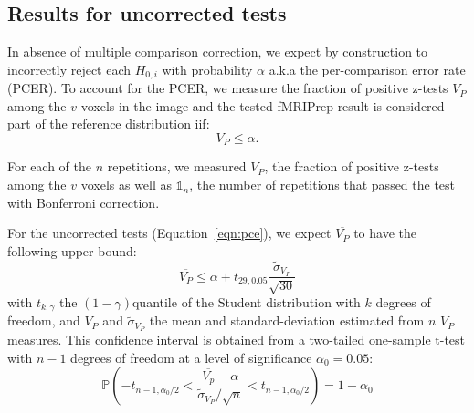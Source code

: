 \documentclass{article}
\newcommand{\fmriprep}{fMRIPrep\xspace}
\begin{document}
\begin{appendices}
    \section{Results for uncorrected tests}
    \label{appendix:multiple-comparison-tests}

    In absence of multiple comparison correction, we expect
    by construction to incorrectly reject each $H_{0,i}$ with probability $\alpha$ a.k.a
    the per-comparison error rate (PCER). To account for the PCER, we measure the
    fraction of positive z-tests $V_P$ among the $v$ voxels in the image and the
    tested \fmriprep result is considered part of the reference distribution iif:
    \begin{equation}
        V_{P} \leq \alpha.
        \label{eqn:pce}
    \end{equation}

    For each of the $n$ repetitions,
    we measured $V_P$, the fraction of
    positive z-tests among the $v$ voxels as well as $\mathds{1}_n$, the number of repetitions
    that passed the test with Bonferroni correction.

    For the uncorrected tests (Equation~\ref{eqn:pce}), we expect $\overline{V_P}$ to have
    the following upper bound:
    \[
        \overline{V_P} \leq
        \alpha  + t_{29,0.05} \frac{\tilde{\sigma}_{V_P}}{\sqrt{30}}
    \]
    with
    $t_{k,\gamma}$ the $(1-\gamma)$quantile of the Student distribution with $k$ degrees of freedom,
    and $\overline{V_P}$ and $\tilde{\sigma}_{V_P}$ the mean and standard-deviation estimated from
    $n$ $V_P$ measures.
    This confidence interval is obtained from a two-tailed one-sample
    t-test with $n-1$ degrees of freedom at a level of significance $\alpha_0=0.05$:
    \[
        \mathbb{P}
        \left(
        -t_{n-1,\alpha_0/2}
        <
        \dfrac{\overline{V_p} - \alpha}{\tilde{\sigma}_{V_P} / \sqrt{n}}
        <
        t_{n-1,\alpha_0/2}
        \right)
        = 1 - \alpha_0
    \]





\end{appendices}
\end{document}

